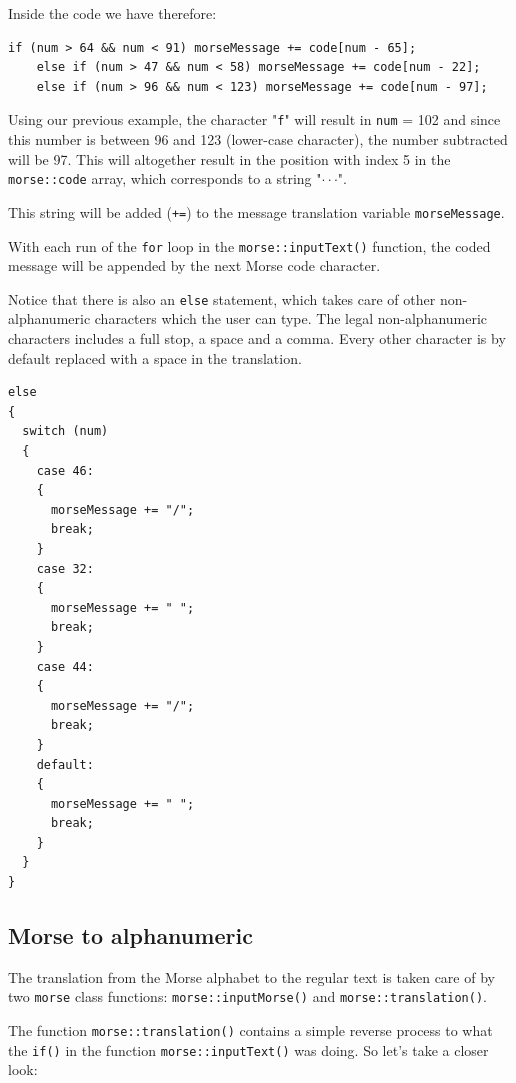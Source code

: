 \documentclass[12pt]{report}
\begin{document}
Inside the code we have therefore:

\begin{lstlisting}
if (num > 64 && num < 91) morseMessage += code[num - 65];
	else if (num > 47 && num < 58) morseMessage += code[num - 22];
	else if (num > 96 && num < 123) morseMessage += code[num - 97];
\end{lstlisting}

Using our previous example, the character "\verb|f|" will result in \verb|num| = 102 and since this number is between 96 and 123 (lower-case character), the number subtracted will be 97. This will altogether result in the position with index 5 in the \verb|morse::code| array, which corresponds to a string "$\cdot\cdot$\text{-}$\cdot$". 

This string will be added (\verb|+=|) to the message translation variable \verb|morseMessage|.

With each run of the \verb|for| loop in the \verb|morse::inputText()| function, the coded message will be appended by the next Morse code character.

Notice that there is also an \verb|else| statement, which takes care of other non-alphanumeric characters which the user can type. The legal non-alphanumeric characters includes a full stop, a space and a comma. Every other character is by default replaced with a space in the translation.


\begin{lstlisting}
else
{
  switch (num)
  {
    case 46:
    {
      morseMessage += "/";
      break;
    }
    case 32:
    {
      morseMessage += " ";
      break;
    }
    case 44:
    {
      morseMessage += "/";
      break;
    }
    default:
    {
      morseMessage += " ";
      break;
    }
  }
}
\end{lstlisting}


\subsection{Morse to alphanumeric}

The translation from the Morse alphabet to the regular text is taken care of by two \verb|morse| class functions: \verb|morse::inputMorse()| and \verb|morse::translation()|.

The function \verb|morse::translation()| contains a simple reverse process to what the \verb|if()| in the function \verb|morse::inputText()| was doing. So let's take a closer look:

\newpage
\end{document}

